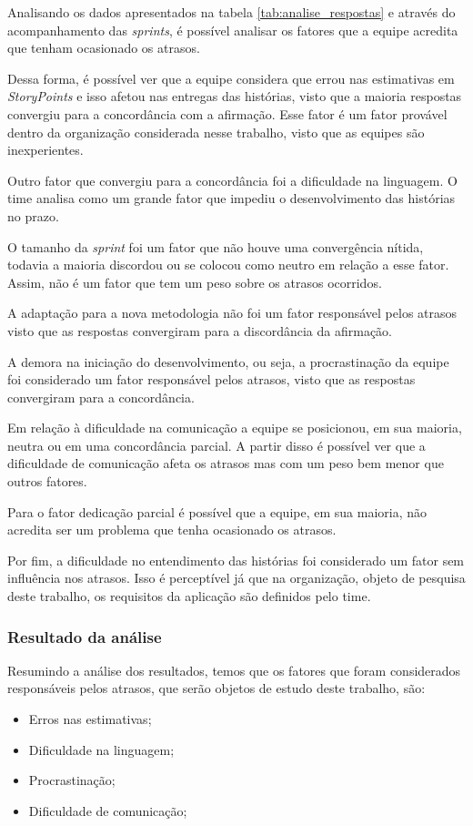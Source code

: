 			Analisando os dados apresentados na tabela \ref{tab:analise_respostas} e através do acompanhamento das \textit{sprints}, é possível analisar os fatores que a equipe acredita que tenham ocasionado os atrasos.
	
			Dessa forma, é possível ver que a equipe considera que errou nas estimativas em \textit{StoryPoints} e isso afetou nas entregas das histórias, visto que a maioria respostas convergiu para a concordância com a afirmação. Esse fator é um fator provável dentro da organização considerada nesse trabalho, visto que as equipes são inexperientes.

			Outro fator que convergiu para a concordância foi a dificuldade na linguagem. O time analisa como um grande fator que impediu o desenvolvimento das histórias no prazo.

			O tamanho da \textit{sprint} foi um fator que não houve uma convergência nítida, todavia a maioria discordou ou se colocou como neutro em relação a esse fator. Assim, não é um fator que tem um peso sobre os atrasos ocorridos.

			A adaptação para a nova metodologia não foi um fator responsável pelos atrasos visto que as respostas convergiram para a discordância da afirmação.

			A demora na iniciação do desenvolvimento, ou seja, a procrastinação da equipe foi considerado um fator responsável pelos atrasos, visto que as respostas convergiram para a concordância.

			Em relação à dificuldade na comunicação a equipe se posicionou, em sua maioria, neutra ou em uma concordância parcial. A partir disso é possível
			ver que a dificuldade de comunicação afeta os atrasos mas com um peso bem menor que outros fatores.

			Para o fator dedicação parcial é possível que a equipe, em sua maioria, não acredita ser um problema que tenha ocasionado os atrasos.

			Por fim, a dificuldade no entendimento das histórias foi considerado um fator sem influência nos atrasos. Isso é perceptível já que na organização, objeto de pesquisa deste trabalho, os requisitos da aplicação são definidos pelo time.

		\subsubsection{Resultado da análise}
			Resumindo a análise dos resultados, temos que os fatores que foram considerados responsáveis pelos atrasos, que serão objetos de estudo deste trabalho, são:

			\begin{itemize}
				\item Erros nas estimativas;
				\item Dificuldade na linguagem;
				\item Procrastinação;
				\item Dificuldade de comunicação;
			\end{itemize}